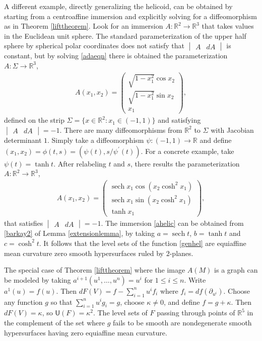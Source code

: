 \documentclass [leqno, 10pt]{amsart}
\theoremstyle{definition}
\numberwithin{equation}{section}
\newcommand{\sech}{\operatorname{sech}}
\newcommand{\U}{\mathsf{U}}
\newcommand{\ka}{\kappa}
\newcommand{\pr}{\partial}
\newcommand{\rea}{\mathbb R}
\begin{document}
A different example, directly generalizing the helicoid, can be obtained by starting from a centroaffine immersion and explicitly solving for a diffeomorphism as in Theorem \ref{lifttheorem}. Look for an immersion $A: \rea^{2} \to \rea^{3}$ that takes values in the Euclidean unit sphere. The standard parameterization of the upper half sphere by spherical polar coordinates does not satisfy that $\begin{vmatrix} A & dA\end{vmatrix}$ is constant, but by solving \eqref{adaeqn} there is obtained the parameterization $A:\Sigma \to \rea^{3}$,
\begin{align}
A(x_{1}, x_{2}) = \begin{pmatrix} \sqrt{1 - x_{1}^{2}}\cos x_{2} \\ \sqrt{1 - x_{1}^{2}}\sin x_{2} \\ x_{1} \end{pmatrix},
\end{align}
defined on the strip $\Sigma = \{x \in \rea^{2}: x_{1} \in (-1, 1)\}$ and satisfying $\begin{vmatrix} A & dA \end{vmatrix} = -1$. There are many diffeomorphisms from $\rea^{2}$ to $\Sigma$ with Jacobian determinant $1$. Simply take a diffeomorphism $\psi:(-1, 1) \to \rea$ and define $(x_{1}, x_{2}) = \phi(t, s) = (\psi(t),  s/\psi^{\prime}(t))$. For a concrete example, take $\psi(t) = \tanh{t}$. After relabeling $t$ and $s$, there results the parameterization $A:\rea^{2} \to \rea^{3}$,
\begin{align}\label{ahelic}
A(x_{1}, x_{2}) = \begin{pmatrix} \sech{x_{1}} \cos( x_{2}\cosh^{2}{x_{1}}) \\ \sech{x_{1}} \sin( x_{2}\cosh^{2}{x_{1}})  \\ \tanh{x_{1}} \end{pmatrix},
\end{align}
that satisfies $\begin{vmatrix} A & dA \end{vmatrix} = -1$. The immersion \eqref{ahelic} can be obtained from \eqref{barkay2} of Lemma \ref{extensionlemma}, by taking $a = \sech t$, $b = \tanh t$ and $c = \cosh^{2}t$.
It follows that the level sets of the function \eqref{genhel} are equiaffine mean curvature zero smooth hypersurfaces ruled by $2$-planes. 

The special case of Theorem \ref{lifttheorem} where the image $A(M)$ is a graph can be modeled by taking $a^{i+1}(u^{1}, \dots, u^{n}) = u^{i}$ for $1 \leq i \leq n$. Write $a^{1}(u)= f(u)$. Then $dF(V) = f - \sum_{i = 1}^{n}u^{i}f_{i}$ where $f_{i} = df(\pr_{u^{i}})$. Choose any function $g$ so that $\sum_{i= 1}^{n}u^{i}g_{i} = g$, choose $\ka \neq 0$, and define $f = g + \ka$. Then $dF(V) = \ka$, so $\U(F) = \ka^{2}$. The level sets of $F$ passing through points of $\rea^{5}$ in the complement of the set where $g$ fails to be smooth are nondegenerate smooth hypersurfaces having zero equiaffine mean curvature.
\end{document}
